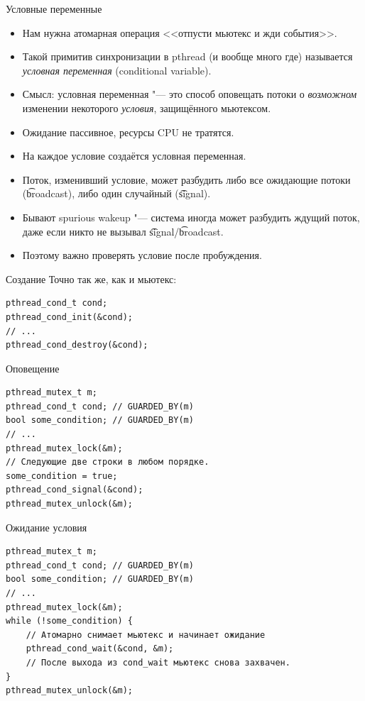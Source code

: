 \begin{frame}{Условные переменные}
	\begin{itemize}
		\item Нам нужна атомарная операция <<отпусти мьютекс и жди события>>.
		\item Такой примитив синхронизации в pthread (и вообще много где) называется \textit{условная переменная} (conditional variable).
		\item Смысл: условная переменная "--- это способ оповещать потоки о \textit{возможном} изменении некоторого \textit{условия}, защищённого мьютексом.
		\item Ожидание пассивное, ресурсы CPU не тратятся.
		\item На каждое условие создаётся условная переменная.
		\item Поток, изменивший условие, может разбудить либо все ожидающие потоки (\t{broadcast}), либо один случайный (\t{signal}).
		\item Бывают spurious wakeup "--- система иногда может разбудить ждущий поток, даже если никто не вызывал \t{signal}/\t{broadcast}.
		\item Поэтому важно проверять условие после пробуждения.
	\end{itemize}
\end{frame}

\begin{frame}[fragile]{Создание}
	Точно так же, как и мьютекс:
\begin{verbatim}
pthread_cond_t cond;
pthread_cond_init(&cond);
// ...
pthread_cond_destroy(&cond);
\end{verbatim}
\end{frame}

\begin{frame}[fragile]{Оповещение}
\begin{verbatim}
pthread_mutex_t m;
pthread_cond_t cond; // GUARDED_BY(m)
bool some_condition; // GUARDED_BY(m)
// ...
pthread_mutex_lock(&m);
// Следующие две строки в любом порядке.
some_condition = true;
pthread_cond_signal(&cond);
pthread_mutex_unlock(&m);
\end{verbatim}
\end{frame}

\begin{frame}[fragile]{Ожидание условия}
\begin{verbatim}
pthread_mutex_t m;
pthread_cond_t cond; // GUARDED_BY(m)
bool some_condition; // GUARDED_BY(m)
// ...
pthread_mutex_lock(&m);
while (!some_condition) {
    // Атомарно снимает мьютекс и начинает ожидание
    pthread_cond_wait(&cond, &m);
    // После выхода из cond_wait мьютекс снова захвачен.
}
pthread_mutex_unlock(&m);
\end{verbatim}
\end{frame}


